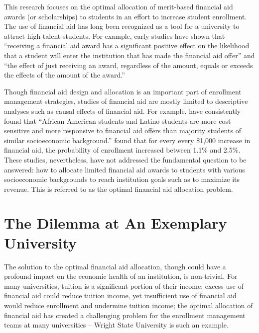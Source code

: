 \documentclass[12pt,english]{report}
\begin{document}

This research focuses on the optimal allocation of merit-based financial aid awards (or scholarships) to students in an effort to increase student enrollment. The use of financial aid has long been recognized as a tool for a university to attract high-talent students. For example, early studies \citep{heller1997student,jacksonfinancial,leslie1988economic} have shown that ``receiving a financial aid award has a significant positive effect on the likelihood that a student will enter the institution that has  made the financial aid offer'' and ``the effect of just receiving an award, regardless of the amount, equals or exceeds the effects of the amount of the award.''

Though financial aid design and allocation is an important part of enrollment management strategies, studies of financial aid are mostly limited to descriptive analyses such as causal effects of financial aid.  For example, \citet{hossler1989understanding} have consistently found that ``African American students and Latino students are more cost sensitive and more responsive to financial aid offers than majority students of similar socioeconomic background.''  \citet{braunstein1999measuring} found that for every every \$1,000 increase in financial aid, the probability  of  enrollment increased between 1.1\% and 2.5\%.  These studies, nevertheless, have not addressed the fundamental question to be answered: how to allocate limited financial aid awards to students with various socioeconomic backgrounds to reach institution goals such as to maximize its revenue. This is referred to as the optimal financial aid allocation problem.

\section{The Dilemma at An Exemplary University}
The solution to the optimal financial aid allocation, though could have a profound impact on the economic health of an institution, is non-trivial. For many universities, tuition is a significant portion of their income; excess use of financial aid  could reduce tuition income, yet insufficient use of financial aid would reduce enrollment and undermine tuition income; the optimal allocation of financial aid has created a challenging problem for the enrollment management teams at many universities -- Wright State University is such an example.   
\end{document}
